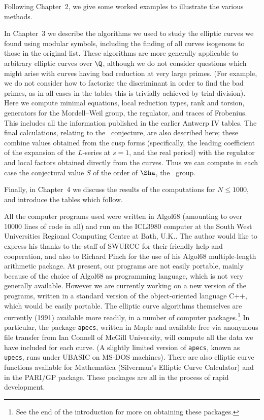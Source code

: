 Following Chapter~2, we give some worked examples to illustrate the
various methods.

In Chapter~3 we describe the algorithms we used to study the elliptic
curves we found using modular symbols, including the finding of all
curves isogenous to those in the original list.  These algorithms are
more generally applicable to arbitrary elliptic curves over $\Q$,
although we do not consider questions which might arise with curves
having bad reduction at very large primes.  (For example, we do not
consider how to factorize the discriminant in order to find the bad
primes, as in all cases in the tables this is trivially achieved by
trial division). Here we compute minimal equations, local reduction
types, rank and torsion, generators for the Mordell--Weil group, the
regulator, and traces of Frobenius.  This includes all the information
published in the earlier Antwerp IV tables. The final calculations,
relating to the \BSD\ conjecture, are also described here; these
combine values obtained from the cusp forms (specifically, the leading
coefficient of the expansion of the $L$-series at $s=1$, and the real
period) with the regulator and local factors obtained directly from
the curves.  Thus we can compute in each case the conjectural value
$S$ of the order of $\Sha$, the \TS\ group.

Finally, in Chapter~4 we discuss the results of the computations for 
$N\le1000$, and introduce the tables which follow.

All the computer programs used were written in Algol68 (amounting to
over 10000 lines of code in all) and run on the ICL3980 computer at
the South West Universities Regional Computing Centre at Bath, U.K..
The author would like to express his thanks to the staff of SWURCC for
their friendly help and cooperation, and also to Richard Pinch for the
use of his Algol68 multiple-length arithmetic package.  At present,
our programs are not easily portable, mainly because of the choice of
Algol68 as programming language, which is not very generally
available.  However we are currently working on a new version of the
programs, written in a standard version of the object-oriented
language C++, which would be easily portable.  The elliptic curve
algorithms themselves are currently (1991) available more readily, in
a number of computer packages.\footnote{See the end of the
introduction for more on obtaining these packages.}  In particular,
the package {\tt apecs}, written in Maple and available free via
anonymous file transfer from Ian Connell of McGill University, will
compute all the data we have included for each curve. (A slightly
limited version of {\tt apecs}, known as {\tt upecs}, runs under
UBASIC on MS-DOS machines).  There are also elliptic curve functions
available for Mathematica (Silverman's Elliptic Curve Calculator) and
in the PARI/GP package.  These packages are all in the process of
rapid development.

